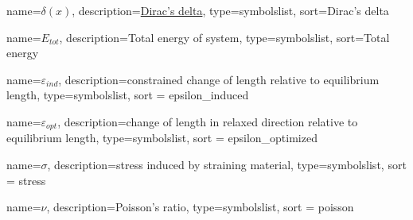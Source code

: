 {
    name=\ensuremath{\delta(x)},
    description={\href{https://pl.wikipedia.org/wiki/Delta_Diraca}{Dirac's delta}},
    type=symbolslist,
    sort={Dirac's delta}
}

{
	name=\ensuremath{E_{tot}},
	description={Total energy of system},
	type=symbolslist,
	sort=Total energy
}

{
    name=\ensuremath{\varepsilon_{ind}},
    description={constrained change of length relative to equilibrium length},
    type=symbolslist,
    sort = epsilon_induced
}

{
    name=\ensuremath{\varepsilon_{opt}},
    description={change of length in relaxed direction relative to equilibrium length},
    type=symbolslist,
    sort = epsilon_optimized
}

{
    name=\ensuremath{\sigma},
    description={stress induced by straining material},
    type=symbolslist,
    sort = stress
}

{
    name=\ensuremath{\nu},
    description={Poisson's ratio},
    type=symbolslist,
    sort = poisson
}
